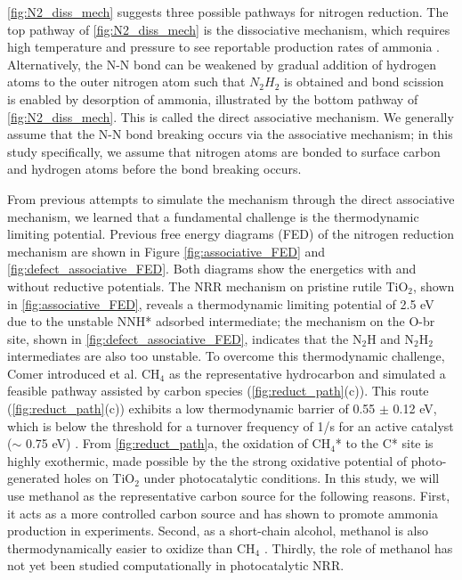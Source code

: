 \ref{fig:N2_diss_mech} suggests three possible pathways for nitrogen reduction. The top pathway of \ref{fig:N2_diss_mech} is the dissociative mechanism, which requires high temperature and pressure to see reportable production rates of ammonia \cite{Honkala_2005}. Alternatively, the N-N bond can be weakened by gradual addition of hydrogen atoms to the outer nitrogen atom such that $N_2H_2$ is obtained and bond scission is enabled by desorption of ammonia, illustrated by the bottom pathway of \ref{fig:N2_diss_mech}. This is called the direct associative mechanism. We generally assume that the N-N bond breaking occurs via the associative mechanism; in this study specifically, we assume that nitrogen atoms are bonded to surface carbon and hydrogen atoms before the bond breaking occurs.
 
From previous attempts to simulate the mechanism through the direct associative mechanism, we learned that a fundamental challenge is the thermodynamic limiting potential. Previous free energy diagrams (FED) of the nitrogen reduction mechanism are shown in Figure  \ref{fig:associative_FED} and \ref{fig:defect_associative_FED}. Both diagrams show the energetics with and without reductive potentials. The NRR mechanism on pristine rutile TiO$_2$, shown in \ref{fig:associative_FED}, reveals a thermodynamic limiting potential of 2.5 eV due to the unstable NNH* adsorbed intermediate; the mechanism on the O-br site, shown in \ref{fig:defect_associative_FED}, indicates that the N$_2$H and N$_2$H$_2$ intermediates are also too unstable. To overcome this thermodynamic challenge, Comer introduced et al. CH$_4$ as the representative hydrocarbon and simulated a feasible pathway assisted by carbon species \cite{comer2018role} (\ref{fig:reduct_path}(c)). This route (\ref{fig:reduct_path}(c)) exhibits a low thermodynamic barrier of 0.55 $\pm$ 0.12 eV, which is below the threshold for a turnover frequency of 1/s for an active catalyst ($\sim$ 0.75 eV) \cite{Iriawan_2021}. From \ref{fig:reduct_path}a, the oxidation of CH$_4$* to the C* site is highly exothermic, made possible by the the strong oxidative potential of photo-generated holes on TiO$_2$ under photocatalytic conditions. In this study, we will use methanol as the representative carbon source for the following reasons. First, it acts as a more controlled carbon source and has shown to promote ammonia production in experiments. Second, as a short-chain alcohol, methanol is also thermodynamically easier to oxidize than CH$_4$ \cite{comer2018role}. Thirdly, the role of methanol has not yet been studied computationally in photocatalytic NRR.


